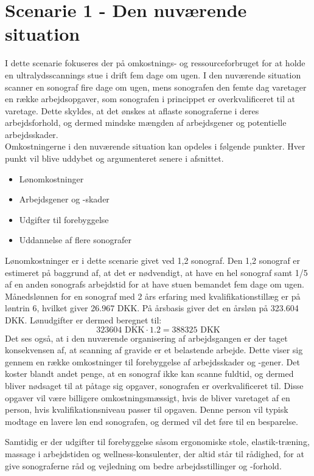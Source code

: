 \section{Scenarie 1 - Den nuværende situation}
I dette scenarie fokuseres der på omkostnings- og ressourceforbruget for at holde en ultralydsscannings stue i drift fem dage om ugen. I den nuværende situation scanner en sonograf fire dage om ugen, mens sonografen den femte dag varetager en række arbejdsopgaver, som sonografen i princippet er overkvalificeret til at varetage. Dette skyldes, at det ønskes at aflaste sonograferne i deres arbejdsforhold, og dermed mindske mængden af arbejdsgener og potentielle arbejdsskader. \\
Omkostningerne i den nuværende situation kan opdeles i følgende punkter. Hver punkt vil blive uddybet og argumenteret senere i afsnittet. 
\begin{itemize}
\item Lønomkostninger
\item Arbejdsgener og -skader
\item Udgifter til forebyggelse
\item Uddannelse af flere sonografer
\end{itemize}
Lønomkostninger er i dette scenarie givet ved 1,2 sonograf. Den 1,2 sonograf er estimeret på baggrund af, at det er nødvendigt, at have en hel sonograf samt 1/5 af en anden sonografs arbejdstid for at have stuen bemandet fem dage om ugen. Månedslønnen for en sonograf med 2 års erfaring med kvalifikationstillæg er på løntrin 6, hvilket giver 26.967 DKK. På årsbasis giver det en årsløn på 323.604 DKK. Lønudgifter er dermed beregnet til:
\begin{equation}
323604 \text{ DKK}\cdot1.2 = 388325 \text{ DKK}
\end{equation}
Det ses også, at i den nuværende organisering af arbejdsgangen er der taget konsekvensen af, at scanning af gravide er et belastende arbejde. Dette viser sig gennem en række omkostninger til forebyggelse af arbejdsskader og -gener. Det koster blandt andet penge, at en sonograf ikke kan scanne fuldtid, og dermed bliver nødsaget til at påtage sig opgaver, sonografen er overkvalificeret til. Disse opgaver vil være billigere omkostningsmæssigt, hvis de bliver varetaget af en person, hvis kvalifikationsniveau passer til opgaven. Denne person vil typisk modtage en lavere løn end sonografen, og dermed vil det føre til en besparelse. 

Samtidig er der udgifter til forebyggelse såsom ergonomiske stole, elastik-træning, massage i arbejdstiden og wellness-konsulenter, der altid står til rådighed, for at give sonograferne råd og vejledning om bedre arbejdsstillinger og -forhold. 

